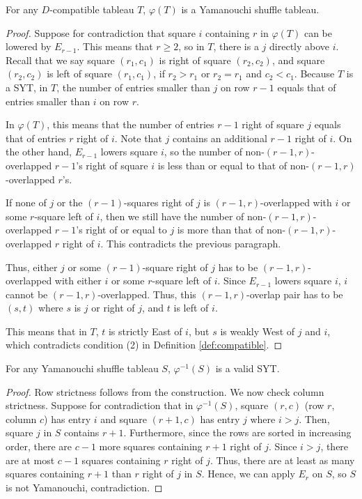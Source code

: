 \documentclass[ALCO,Unicode]{cedram}
\begin{document}
    \begin{lemma}\label{lem:phiT-yama}
        For any $D$-compatible tableau $T$, $\varphi(T)$ is a Yamanouchi shuffle tableau.
    \end{lemma}

    \begin{proof}
        Suppose for contradiction that square $i$ containing $r$ in $\varphi(T)$ can be lowered by $E_{r-1}$. This means that $r\geq 2$, so in $T$, there is a $j$ directly above $i$. Recall that we say square $(r_1,c_1)$ is right of square $(r_2,c_2)$, and square $(r_2,c_2)$ is left of square $(r_1,c_1)$, if $r_2 > r_1$ or $r_2 = r_1$ and $c_2 < c_1$. Because $T$ is a SYT, in $T$, the number of entries smaller than $j$ on row $r-1$ equals that of entries smaller than $i$ on row $r$.

        In $\varphi(T)$, this means that the number of entries $r-1$ right of square $j$ equals that of entries $r$ right of $i$. Note that $j$ contains an additional $r-1$ right of $i$. On the other hand, $E_{r-1}$ lowers square $i$, so the number of non-$(r-1,r)$-overlapped $r-1$'s right of square $i$ is less than or equal to that of non-$(r-1,r)$-overlapped $r$'s.

        If none of $j$ or the $(r-1)$-squares right of $j$ is $(r-1,r)$-overlapped with $i$ or some $r$-square left of $i$, then we still have the number of non-$(r-1,r)$-overlapped $r-1$'s right of or equal to $j$ is more than that of non-$(r-1,r)$-overlapped $r$ right of $i$. This contradicts the previous paragraph.

        Thus, either $j$ or some $(r-1)$-square right of $j$ has to be $(r-1,r)$-overlapped with either $i$ or some $r$-square left of $i$. Since $E_{r-1}$ lowers square $i$, $i$ cannot be $(r-1,r)$-overlapped. Thus, this $(r-1,r)$-overlap pair has to be $(s,t)$ where $s$ is $j$ or right of $j$, and $t$ is left of $i$.

        This means that in $T$, $t$ is strictly East of $i$, but $s$ is weakly West of $j$ and $i$, which contradicts condition (2) in Definition \ref{def:compatible}.
    \end{proof}

    \begin{lemma}\label{lem:phiS-valid}
        For any Yamanouchi shuffle tableau $S$, $\varphi^{-1}(S)$ is a valid SYT.
    \end{lemma}

    \begin{proof}
        Row strictness follows from the construction. We now check column strictness. Suppose for contradiction that in $\varphi^{-1}(S)$, square $(r,c)$ (row $r$, column $c$) has entry $i$ and square $(r+1,c)$ has entry $j$ where $i > j$. Then, square $j$ in $S$ contains $r+1$. Furthermore, since the rows are sorted in increasing order, there are $c-1$ more squares containing $r+1$ right of $j$. Since $i > j$, there are at most $c-1$ squares containing $r$ right of $j$. Thus, there are at least as many squares containing $r+1$ than $r$ right of $j$ in $S$. Hence, we can apply $E_r$ on $S$, so $S$ is not Yamanouchi, contradiction.
    \end{proof}
\end{document}
